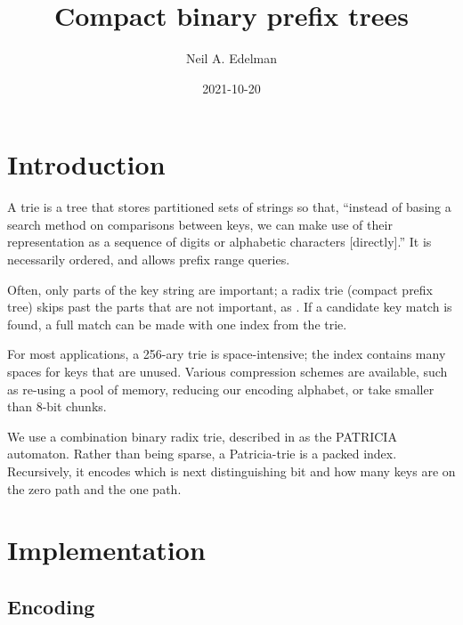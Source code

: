 \documentclass[12pt]{article}
\author{Neil A. Edelman}
\title{Compact binary prefix trees}
\date{2021-10-20}
\begin{document}
\maketitle


\section{Introduction}

A trie is a tree that stores partitioned sets of strings\cite{de1959file, fredkin1960trie, jacquet1991analysis, askitis2011redesigning} so that, ``instead of basing a search method on comparisons between keys, we can make use of their representation as a sequence of digits or alphabetic characters [directly].\cite{knuth1997sorting}'' It is necessarily ordered, and allows prefix range queries.

Often, only parts of the key string are important; a radix trie (compact prefix tree) skips past the parts that are not important, as \cite{askitis2007hat}. If a candidate key match is found, a full match can be made with one index from the trie.

For most applications, a 256-ary trie is space-intensive; the index contains many spaces for keys that are unused. Various compression schemes are available, such as re-using a pool of memory\cite{de1959file}, reducing our encoding alphabet, or take smaller than 8-bit chunks\cite{fredkin1960trie}.

We use a combination binary radix trie, described in \cite{morrison1968patricia} as the PATRICIA automaton. Rather than being sparse, a Patricia-trie is a packed index. Recursively, it encodes which is next distinguishing bit and how many keys are on the zero path and the one path.

\section{Implementation}

\subsection{Encoding}
\end{document}
